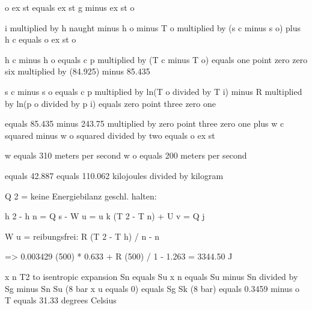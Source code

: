 o ex st equals ex st g minus ex st o

i multiplied by h naught minus h o minus T o multiplied by (s c minus s o) plus h c equals o ex st o

h c minus h o equals c p multiplied by (T c minus T o) equals one point zero zero six multiplied by (84.925) minus 85.435

s c minus s o equals c p multiplied by ln(T o divided by T i) minus R multiplied by ln(p o divided by p i) equals zero point three zero one

equals 85.435 minus 243.75 multiplied by zero point three zero one plus w c squared minus w o squared divided by two equals o ex st

w equals 310 meters per second w o equals 200 meters per second

equals 42.887 equals 110.062 kilojoules divided by kilogram

Q 2 = keine Energiebilanz geschl. halten:

h 2 - h n = Q s - W u = u k (T 2 - T n) + U v = Q j

W u = reibungsfrei: R (T 2 - T h) / n - n

=> 0.003429 (500) * 0.633 + R (500) / 1 - 1.263 = 3344.50 J

x n T2 to isentropic expansion  
Sn equals Su  
x n equals Su minus Sn divided by Sg minus Sn  
Su (8 bar x u equals 0) equals Sg Sk (8 bar) equals 0.3459  
minus o T equals 31.33 degrees Celsius